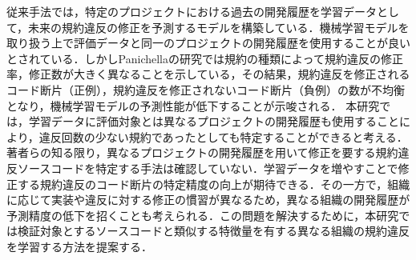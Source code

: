 \documentclass[T,J]{fose} %
\newcommand{\todo}[1]{\colorbox{yellow}{{\bf TODO}:}{\color{red} {\textbf{[#1]}}}}
\begin{document}


従来手法では，特定のプロジェクトにおける過去の開発履歴を学習データとして，未来の規約違反の修正を予測するモデルを構築している．機械学習モデルを取り扱う上で評価データと同一のプロジェクトの開発履歴を使用することが良いとされている．しかしPanichellaの研究では規約の種類によって規約違反の修正率，修正数が大きく異なることを示している\cite{}，その結果，規約違反を修正されるコード断片（正例），規約違反を修正されないコード断片（負例）の数が不均衡となり，機械学習モデルの予測性能が低下することが示唆される．
本研究では，学習データに評価対象とは異なるプロジェクトの開発履歴も使用することにより，違反回数の少ない規約であったとしても特定することができると考える．著者らの知る限り，異なるプロジェクトの開発履歴を用いて修正を要する規約違反ソースコードを特定する手法は確認していない．学習データを増やすことで修正する規約違反のコード断片の特定精度の向上が期待できる．その一方で，組織に応じて実装や違反に対する修正の慣習が異なるため，異なる組織の開発履歴が予測精度の低下を招くことも考えられる．この問題を解決するために，本研究では検証対象とするソースコードと類似する特徴量を有する異なる組織の規約違反を学習する方法を提案する．




\end{document}
